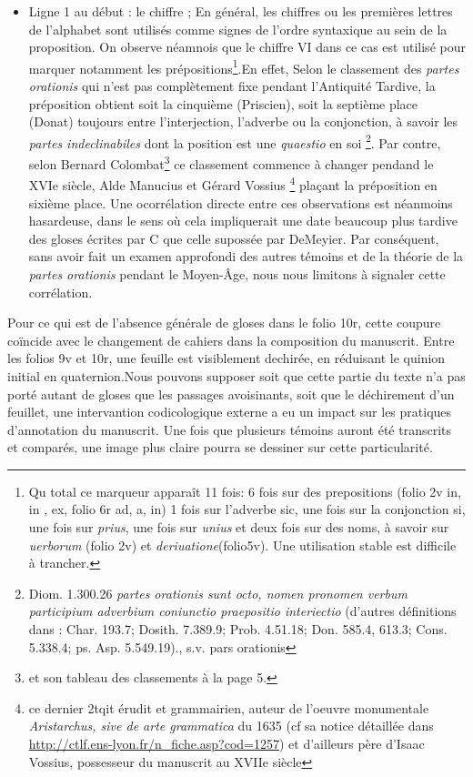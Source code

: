 \documentclass[a4paper, twoside, 12pt]{book}
\begin{document}
\begin{itemize}
    \item Ligne 1 au début : le chiffre   ; En général, les chiffres ou les premières lettres de l'alphabet sont utilisés comme signes de l'ordre syntaxique au sein de la proposition. On observe néamnois que le chiffre VI dans ce cas est utilisé pour marquer notamment les prépositions\footnote{Qu total ce marqueur apparaît 11 fois: 6 fois sur des prepositions (folio 2v in, in , ex, folio 6r ad, a, in) 1 fois sur l'adverbe sic, une fois sur la conjonction si, une fois sur \textit{prius}, une fois sur \textit{unius} et deux fois sur des noms, à savoir sur \textit{uerborum} (folio 2v) et \textit{deriuatione}(folio5v). Une utilisation stable est difficile à trancher.}.En effet, Selon le classement des \textit{partes orationis} qui n'est pas complètement fixe pendant l'Antiquité Tardive, la préposition obtient soit la cinquième (Priscien), soit la septième place (Donat) toujours entre l'interjection, l'adverbe ou la conjonction, à savoir les \textit{partes indeclinabiles} dont la position est une \textit{quaestio} en soi \footnote{Diom. 1.300.26 \textit{partes orationis sunt octo, nomen pronomen verbum participium adverbium coniunctio praepositio interiectio} (d'autres définitions dans : Char. 193.7; Dosith. 7.389.9; Prob. 4.51.18; Don. 585.4, 613.3; Cons. 5.338.4; ps. Asp. 5.549.19).\cite{schad2007lexicon}, s.v.\og{} pars orationis \fg{}}. Par contre, selon Bernard Colombat\footnote{\cite{colombat1988parties} et son tableau des classements à la page 5.} ce classement commence à changer pendand le XVIe siècle, Alde Manucius et Gérard Vossius \footnote{ce dernier 2tqit érudit et grammairien, auteur de l'oeuvre monumentale \textit{Aristarchus, sive de arte grammatica} du 1635 (cf sa notice détaillée dans \url{http://ctlf.ens-lyon.fr/n_fiche.asp?cod=1257}) et d'ailleurs père d'Isaac Vossius, possesseur du manuscrit au XVIIe siècle} plaçant la préposition en sixième place. Une ocorrélation directe entre ces observations est néanmoins hasardeuse, dans le sens où cela impliquerait une date beaucoup plus tardive des gloses écrites par C que celle supossée par DeMeyier. Par conséquent, sans avoir fait un examen approfondi des autres témoins et de la théorie de la \textit{partes orationis} pendant le Moyen-Âge, nous nous limitons à signaler cette corrélation. 
   
\end{itemize}

Pour ce qui est de l'absence générale de gloses dans le folio 10r, cette coupure coïncide avec le changement de cahiers dans la composition du manuscrit. Entre les folios 9v et 10r, une feuille est visiblement dechirée, en réduisant le quinion initial en quaternion.Nous pouvons supposer soit que cette partie du texte n'a pas porté autant de gloses que les passages avoisinants, soit que le déchirement d'un feuillet, une intervantion codicologique externe a eu un impact sur les pratiques d'annotation du manuscrit. Une fois que plusieurs témoins auront été transcrits et comparés, une image plus claire pourra se dessiner sur cette particularité.
\end{document}
